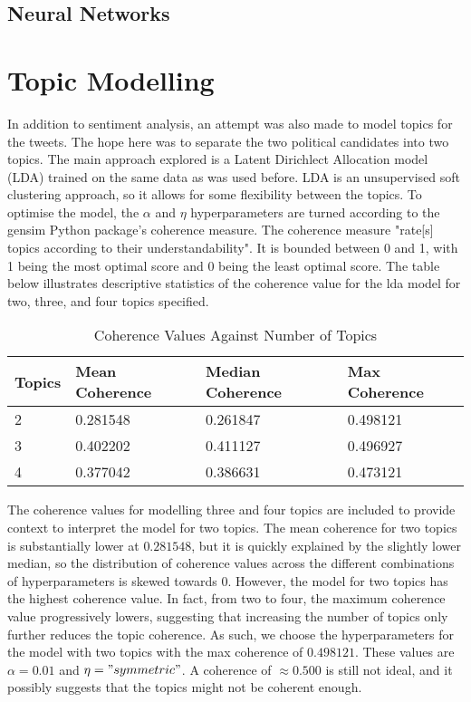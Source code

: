 \documentclass{article}
\begin{document}
  \subsection{Neural Networks}
  \section{Topic Modelling}

  In addition to sentiment analysis, an attempt was also made to model
  topics for the tweets. The hope here was to separate the two
  political candidates into two topics. The main approach explored is
  a Latent Dirichlect Allocation model (LDA) trained on the same data
  as was used before. LDA is an unsupervised soft clustering approach,
  so it allows for some flexibility between the topics. To optimise the
  model, the $\alpha$ and $\eta$ hyperparameters are turned according
  to the gensim Python package's coherence measure. The coherence
  measure "rate[s] topics according to their understandability". It is
  bounded between 0 and 1, with 1 being the most optimal score and 0
  being the least optimal score. The table below illustrates
  descriptive statistics of the coherence value for the lda model for
  two, three, and four topics specified. 
  
  \begin{table}[H]
    \centering
    \begin{tabular}{||p{2cm} p{3cm} p{3cm} p{2.5cm} ||}
      \hline
      Topics & Mean Coherence & Median Coherence &  Max Coherence \\ \hline
      2 & 0.281548 & 0.261847 & 0.498121 \\
      3 & 0.402202 & 0.411127 & 0.496927 \\
      4 & 0.377042 & 0.386631 & 0.473121 \\
      \hline
    \end{tabular}
    \caption{\label{tab:lda_hyperparameter_table} Coherence Values Against Number of Topics}
  \end{table}

  The coherence values for modelling three and four topics are
  included to provide context to interpret the model for two
  topics. The mean coherence for two topics is substantially lower at
  $0.281548$, but it is quickly explained by the slightly lower median, so
  the distribution of coherence values across the different
  combinations of hyperparameters is skewed towards $0$. However, the
  model for two topics has the highest coherence value. In fact, from
  two to four, the maximum coherence value progressively lowers,
  suggesting that increasing the number of topics only further reduces
  the topic coherence. As such, we choose the hyperparameters for the
  model with two topics with the max coherence of $0.498121$. These
  values are $\alpha = 0.01$ and $\eta = "symmetric"$. A coherence of
  $\approx 0.500$ is still not ideal, and it possibly suggests that
  the topics might not be coherent enough.
  
\end{document}
